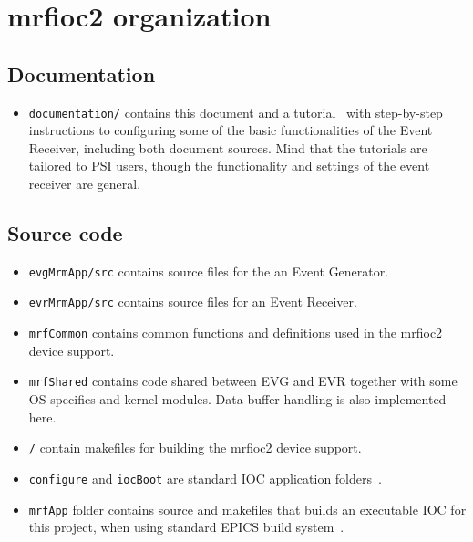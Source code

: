 \documentclass[12pt,a4paper]{article}
\let\stdsection\section
\renewcommand\section{\newpage\stdsection}
\begin{document}

\section{mrfioc2 organization}\label{sec:mrfioc2 organization}
\subsection{Documentation}
\begin{itemize}
\item 
	\texttt{documentation/} contains this document and a tutorial~\cite{tutorial} with step-by-step instructions to configuring some of the basic functionalities of the Event Receiver, including both document sources. Mind that the tutorials are tailored to PSI users, though the functionality and settings of the event receiver are general.
\end{itemize}

\subsection{Source code}
\begin{itemize}
\item 
	\texttt{evgMrmApp/src} contains source files for the an Event Generator.
\item 
	\texttt{evrMrmApp/src} contains source files for an Event Receiver.
\item 
	\texttt{mrfCommon} contains common functions and definitions used in the mrfioc2 device support. 
\item 
	\texttt{mrfShared} contains code shared between EVG and EVR together with some OS specifics and kernel modules. Data buffer handling is also implemented here.
\item 
	\texttt{/} contain makefiles for building the mrfioc2 device support.
\item 
	\texttt{configure} and \texttt{iocBoot} are standard IOC application folders~\cite{appDevGuide}.
\item 
	\texttt{mrfApp} folder contains source and makefiles that builds an executable IOC for this project, when using standard EPICS build system~\cite{appDevGuide}.
\end{itemize}
\end{document}
